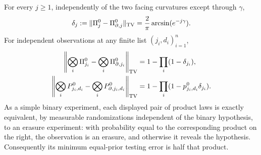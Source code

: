 \begin{theorem}\label{thm:v7-exact-tv}
For every $j\ge1$, independently of the two facing curvatures except
through $\gamma$,
\begin{equation}\label{eq:v7-delta}
 \delta_j:=\|\Pi_j^0-\Pi_{\partial,j}^0\|_{\rm TV}
  =\frac2\pi\arcsin(e^{-j\gamma}).
\end{equation}
For independent observations at any finite list $(j_i,d_i)_{i=1}^n$,
\begin{align}
 \left\|\bigotimes_i\Pi_{j_i}^0-
             \bigotimes_i\Pi_{\partial,j_i}^0\right\|_{\rm TV}
     &=1-\prod_i(1-\delta_{j_i}),\label{eq:v7-cond-product}\\
 \left\|\bigotimes_iP_{j_i,d_i}^0-
             \bigotimes_iP_{\partial,j_i,d_i}^0\right\|_{\rm TV}
     &=1-\prod_i(1-p_{j_i,d_i}^0\delta_{j_i}).\label{eq:v7-raw-product}
\end{align}
As a simple binary experiment, each displayed pair of product laws is
exactly equivalent, by measurable randomizations independent of the
binary hypothesis, to an erasure experiment: with probability equal
to the corresponding product on the right, the observation is an
erasure, and otherwise it reveals the hypothesis. Consequently its
minimum equal-prior testing error is half that product.
\end{theorem}


